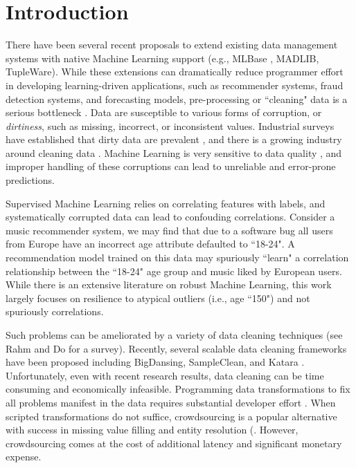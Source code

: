 \section{Introduction}
There have been several recent proposals to extend existing data management systems with native Machine Learning support (e.g., MLBase \cite{kraska2013mlbase}, MADLIB\cite{hellerstein2012madlib}, TupleWare\cite{crotty2014tupleware}).
While these extensions can dramatically reduce programmer effort in developing learning-driven applications, such as recommender systems, fraud detection systems, and forecasting models, pre-processing or ``cleaning" data is a serious bottleneck \cite{kandel2012}. 
Data are susceptible to various forms of corruption, or \emph{dirtiness}, such as missing, incorrect, or inconsistent values.
Industrial surveys have established that dirty data are prevalent \cite{Gartner}, and there is a growing industry around cleaning data \cite{fortunearticle}.
Machine Learning is very sensitive to data quality \cite{xiaofeature}, and improper handling of these corruptions can lead to unreliable and error-prone predictions.

Supervised Machine Learning relies on correlating features with labels, and systematically corrupted data can lead to confouding correlations.
Consider a music recommender system, we may find that due to a software bug all users from Europe have an incorrect age attribute defaulted to ``18-24".
A recommendation model trained on this data may spuriously ``learn" a correlation relationship between the ``18-24" age group and music liked by European users.
While there is an extensive literature on robust Machine Learning, this work largely focuses on resilience to atypical outliers (i.e., age ``150") and not spuriously correlations.

Such problems can be ameliorated by a variety of data cleaning techniques (see Rahm and Do \cite{rahm2000data} for a survey).
Recently, several scalable data cleaning frameworks have been proposed including BigDansing\cite{khayyat2015bigdansing}, SampleClean\cite{sampleclean}, and Katara \cite{chu2015katara}. 
Unfortunately, even with recent research results, data cleaning can be time consuming and economically infeasible\cite{wang1999sample}.
Programming data transformations to fix all problems manifest in the data requires substantial developer effort \cite{kandel2012}.
When scripted transformations do not suffice, crowdsourcing is a popular alternative with success in missing value filling and entity resolution (\cite{gokhale2014corleone, park2014crowdfill, sampleclean,chu2015katara}.
However, crowdsourcing comes at the cost of additional latency and significant monetary expense.


